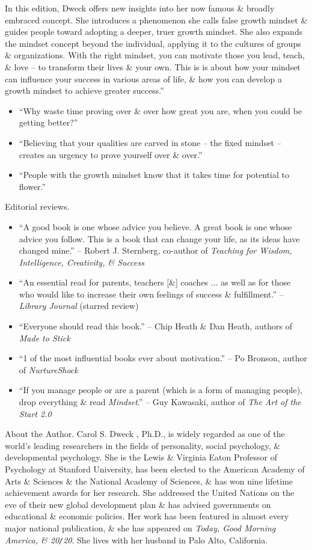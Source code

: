 \documentclass{article}
\begin{document}
\begin{enumerate}
	In this edition, {\sc Dweck} offers new insights into her now famous \& broadly embraced concept. She introduces a phenomenon she calls false growth mindset \& guides people toward adopting a deeper, truer growth mindset. She also expands the mindset concept beyond the individual, applying it to the cultures of groups \& organizations. With the right mindset, you can motivate those you lead, teach, \& love -- to transform their lives \& your own. This is is about how your mindset can influence your success in various areas of life, \& how you can develop a growth mindset to achieve greater success.''
	\begin{itemize}
		\item ``Why waste time proving over \& over how great you are, when you could be getting better?''
		\item ``Believing that your qualities are carved in stone -- the fixed mindset -- creates an urgency to prove yourself over \& over.''
		\item ``People with the growth mindset know that it takes time for potential to flower.''
	\end{itemize}
	{\sf Editorial reviews.}
	\begin{itemize}
		\item ``A good book is one whose advice you believe. A great book is one whose advice you follow. This is a book that can change your life, as its ideas have changed mine.'' -- {\sc Robert J. Sternberg}, co-author of {\it Teaching for Wisdom, Intelligence, Creativity, \& Success}
		\item ``An essential read for parents, teachers [\&] coaches $\ldots$ as well as for those who would like to increase their own feelings of success \& fulfillment.'' -- {\it Library Journal} (starred review)
		\item ``Everyone should read this book.'' -- {\sc Chip Heath \& Dan Heath}, authors of {\it Made to Stick}
		\item ``1 of the most influential books ever about motivation.'' -- {\sc Po Bronson}, author of {\it NurtureShock}
		\item ``If you manage people or are a parent (which is a form of managing people), drop everything \& read {\it Mindset}.'' -- {\sc Guy Kawasaki}, author of {\it The Art of the Start 2.0}
	\end{itemize}
	{\sf About the Author.} {\sc Carol S. Dweck} , Ph.D., is widely regarded as one of the world's leading researchers in the fields of personality, social psychology, \& developmental psychology. She is the Lewis \& Virginia Eaton Professor of Psychology at Stanford University, has been elected to the American Academy of Arts \& Sciences \& the National Academy of Sciences, \& has won nine lifetime achievement awards for her research. She addressed the United Nations on the eve of their new global development plan \& has advised governments on educational \& economic policies. Her work has been featured in almost every major national publication, \& she has appeared on {\it Today, Good Morning America, \& 20{\tt/}20}. She lives with her husband in Palo Alto, California.
	

\end{enumerate}
\end{document}
